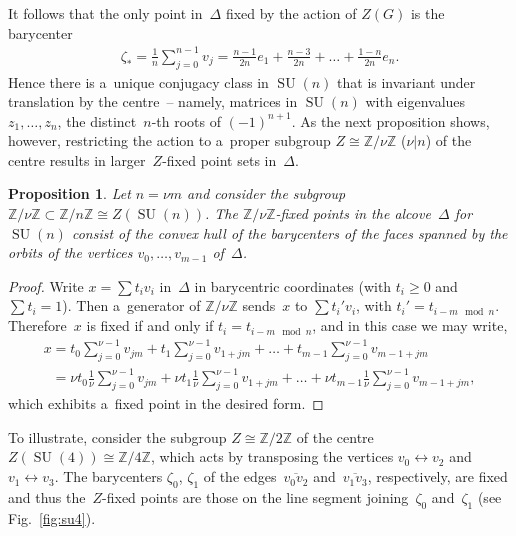 \documentclass[pdftex]{sigma}
\numberwithin{equation}{section}
\newtheorem{Proposition}[Theorem]{Proposition}
{\theoremstyle{definition}
\newtheorem{Definition}[Theorem]{Definition}
\newtheorem{Example}[Theorem]{Example}
\newtheorem{Remark}[Theorem]{Remark}
}
\DeclareMathOperator{\SU}{SU}
\begin{document}
It follows that the only point in~$\Delta$ f\/ixed by the action of $Z(G)$ is the barycenter
\begin{gather*}
\zeta_* = \frac{1}{n} \sum\limits_{j=0}^{n-1} v_j = \frac{n-1}{2n}e_1 + \frac{n-3}{2n} + \dots + \frac{1-n}{2n}e_n.
\end{gather*}
Hence there is a~unique conjugacy class in $\SU(n)$ that is invariant under translation by the centre~-- namely, matrices
in $\SU(n)$ with eigenvalues $z_1, \ldots, z_n$, the distinct~$n$-th roots of $(-1)^{n+1}$.
As the next proposition shows, however, restricting the action to a~proper subgroup $Z\cong
{\mathbb{Z}}/\nu{\mathbb{Z}}$ ($\nu|n$) of the centre results in larger~$Z$-f\/ixed point sets in~$\Delta$.

\begin{Proposition}
Let $n=\nu m$ and consider the subgroup ${\mathbb{Z}}/\nu{\mathbb{Z}} \subset {\mathbb{Z}}/n{\mathbb{Z}} \cong
Z(\SU(n))$.
The ${\mathbb{Z}}/\nu{\mathbb{Z}}$-fixed points in the alcove~$\Delta$ for $\SU(n)$ consist of the convex hull of the
barycenters of the faces spanned by the orbits of the vertices $v_0,\ldots,v_{m-1}$ of~$\Delta$.
\end{Proposition}

\begin{proof}
Write $x=\sum t_i v_i$ in~$\Delta$ in barycentric coordinates (with $t_i\geq 0$ and $\sum t_i=1$).
Then a~generator of ${\mathbb{Z}}/\nu{\mathbb{Z}}$ sends~$x$ to $\sum t_i' v_i$, with $t_i'=t_{i-m \mod n}$.
Therefore~$x$ is f\/ixed if and only if $t_i=t_{i-m \mod n}$, and in this case we may write,
\begin{gather*}
x=t_0 \sum\limits_{j=0}^{\nu-1} v_{jm} + t_1 \sum\limits_{j=0}^{\nu-1} v_{1+jm} + \dots + t_{m-1}
\sum\limits_{j=0}^{\nu-1} v_{m-1+jm}
\\
\phantom{x}{}
 =\nu t_0 \frac{1}{\nu}\sum\limits_{j=0}^{\nu-1} v_{jm} + \nu t_1 \frac{1}{\nu} \sum\limits_{j=0}^{\nu-1} v_{1+jm} +
\dots + \nu t_{m-1} \frac{1}{\nu}\sum\limits_{j=0}^{\nu-1} v_{m-1+jm},
\end{gather*}
which exhibits a~f\/ixed point in the desired form.
\end{proof}

To illustrate, consider the subgroup $Z \cong {\mathbb{Z}}/2{\mathbb{Z}}$ of the centre $Z(\SU(4)) \cong
{\mathbb{Z}}/4{\mathbb{Z}}$, which acts by transposing the vertices $v_0 \leftrightarrow v_2$ and $v_1 \leftrightarrow
v_3$.
The barycenters $\zeta_0$, $\zeta_1$ of the edges~$\overline{v_0v_2}$ and~$\overline{v_1v_3}$, respectively, are f\/ixed
and thus the~$Z$-f\/ixed points are those on the line segment joining~$\zeta_0$ and~$\zeta_1$
(see Fig.~\ref{fig:su4}).
\end{document}
